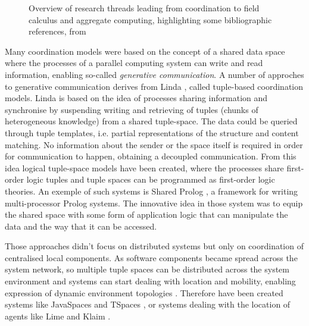 \begin{figure}
\caption{Overview of research threads leading from coordination to field calculus and aggregate computing, highlighting some bibliographic references, from \cite{Survey}}
\label{fig:past-summary} 
\end{figure}

Many coordination models were based on the concept of a shared data space where the processes of a parallel computing system can write and read information, enabling so-called \textit{generative communication}. A number of approches to generative communication derives from Linda \cite{Linda}, called tuple-based coordination models. Linda is based on the idea of processes sharing information and synchronise by suspending writing and retrieving of tuples (chunks of heterogeneous knowledge) from a shared tuple-space. The data could be queried through tuple templates, i.e. partial representations of the structure and content matching. No information about the sender or the space itself is required in order for communication to happen, obtaining a decoupled communication. From this idea logical tuple-space models have been created, where the processes share first-order logic tuples and tuple spaces can be programmed as first-order logic theories. An exemple of such systems is Shared Prolog \cite{SharedProlog}, a framework for writing multi-processor Prolog systems. The innovative idea in those system was to equip the shared space with some form of application logic that can manipulate the data and the way that it can be accessed.

Those approaches didn't focus on distributed systems but only on coordination of centralised local components. As software components became spread across the system network, so multiple tuple spaces can be distributed across the system environment and systems can start dealing with location and mobility, enabling expression of dynamic environment topologies \cite{Survey}. Therefore have been created systems like JavaSpaces \cite{freeman1999javaspaces} and TSpaces \cite{TSpaces}, or systems dealing with the location of agents like Lime \cite{Lime} and Klaim \cite{Klaim}.

